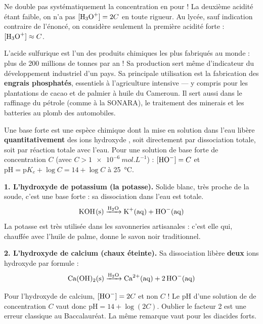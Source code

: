 \documentclass[11pt]{article}
\newcommand{\cle}[1]{{\popxbold\color{popdark}#1}}
\newcounter{popsec}
\newcounter{popsub}
\newcommand{\courssub}[1]{%
  \stepcounter{popsub}%
  \par\vspace{9pt}\noindent{\popxbold\fontsize{11.5}{13}\selectfont\color{popink}{\color{poporange}\thepopsec.\thepopsub}\hspace{6pt}#1}\par\nopagebreak\vspace{4pt}
}
\begin{document}
\begin{attention}
Ne double pas systématiquement la concentration en  pour  ! La deuxième acidité étant faible, on n'a pas $[\ce{H3O+}] = 2C$ en toute rigueur. Au lycée, sauf indication contraire de l'énoncé, on considère seulement la première acidité forte : $[\ce{H3O+}] \approx C$.
\end{attention}

\begin{savaistu}
L'acide sulfurique est l'un des produits chimiques les plus fabriqués au monde : plus de 200 millions de tonnes par an ! Sa production sert même d'indicateur du développement industriel d'un pays. Sa principale utilisation est la fabrication des \textbf{engrais phosphatés}, essentiels à l'agriculture intensive — y compris pour les plantations de cacao et de palmier à huile du Cameroun. Il sert aussi dans le raffinage du pétrole (comme à la SONARA), le traitement des minerais et les batteries au plomb des automobiles.
\end{savaistu}

\courssub{Les bases fortes usuelles}

\begin{definition}
Une \cle{base forte} est une espèce chimique dont la mise en solution dans l'eau libère \textbf{quantitativement} des ions hydroxyde , soit directement par dissociation totale, soit par réaction totale avec l'eau. Pour une solution de base forte de concentration $C$ (avec $C > \SI{1e-6}{mol.L^{-1}}$) : $[\ce{HO-}] = C$ et $\mathrm{pH} = \mathrm{p}K_e + \log C = 14 + \log C$ à \SI{25}{\celsius}.
\end{definition}

\textbf{1. L'hydroxyde de potassium  (la potasse).} Solide blanc, très proche de la soude, c'est une base forte : sa dissociation dans l'eau est totale.
\[ \ce{KOH(s) ->[H2O] K+(aq) + HO-(aq)} \]
La potasse est très utilisée dans les savonneries artisanales : c'est elle qui, chauffée avec l'huile de palme, donne le savon noir traditionnel.

\textbf{2. L'hydroxyde de calcium  (chaux éteinte).} Sa dissociation libère \textbf{deux} ions hydroxyde par formule :
\[ \ce{Ca(OH)2(s) ->[H2O] Ca^2+(aq) + 2 HO-(aq)} \]
\begin{attention}
Pour l'hydroxyde de calcium, $[\ce{HO-}] = 2C$ et non $C$ ! Le pH d'une solution de  de concentration $C$ vaut donc $\mathrm{pH} = 14 + \log(2C)$. Oublier le facteur 2 est une erreur classique au Baccalauréat. La même remarque vaut pour les diacides forts.
\end{attention}
\end{document}
